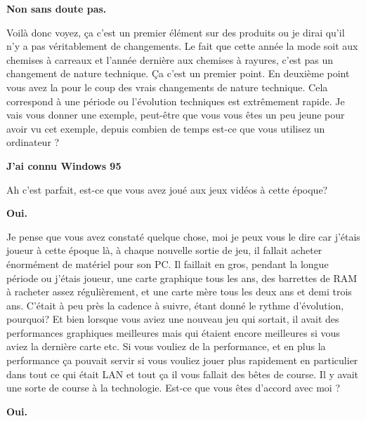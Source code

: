 \begin{small}
\smallbreak\textbf{Non sans doute pas.
}\smallbreak

Voilà donc voyez, ça c'est un premier élément sur des produits ou je dirai qu'il n'y a pas véritablement de changements. Le fait que cette année la mode soit aux chemises à carreaux et l'année dernière aux chemises à rayures, c'est pas un changement de nature technique. Ça c'est un premier point.  En deuxième point vous avez la pour le coup des vrais changements de nature technique. Cela correspond à une période ou l'évolution techniques est extrêmement rapide. Je vais vous donner une exemple, peut-être que vous vous êtes un peu jeune pour avoir vu cet exemple, depuis combien de temps est-ce que vous utilisez un ordinateur ?

\smallbreak\textbf{J'ai connu Windows 95
}\smallbreak

Ah c'est parfait, est-ce que vous avez joué aux jeux vidéos à cette époque? 


\smallbreak\textbf{Oui.
}\smallbreak

Je pense que vous avez constaté quelque chose, moi je peux vous le dire car j'étais joueur à cette époque là, à chaque nouvelle sortie de jeu, il fallait acheter énormément de matériel pour son PC. Il faillait en gros, pendant la longue période ou j'étais joueur, une carte graphique tous les ans, des barrettes de RAM à racheter assez régulièrement, et une carte mère tous les deux ans et demi trois ans. C'était à peu près la cadence à suivre, étant donné le rythme d'évolution, pourquoi? Et bien lorsque vous aviez une nouveau jeu qui sortait, il avait des performances graphiques meilleures mais qui étaient encore meilleures si vous aviez la dernière carte etc. Si vous vouliez de la performance, et en plus la performance ça pouvait servir si vous vouliez jouer plus rapidement en particulier dans tout ce qui était LAN et tout ça il vous fallait des bêtes de course. Il y avait une sorte de course à la technologie. Est-ce que vous êtes d'accord avec moi ?


\smallbreak\textbf{Oui.
}\smallbreak



\end{small}
